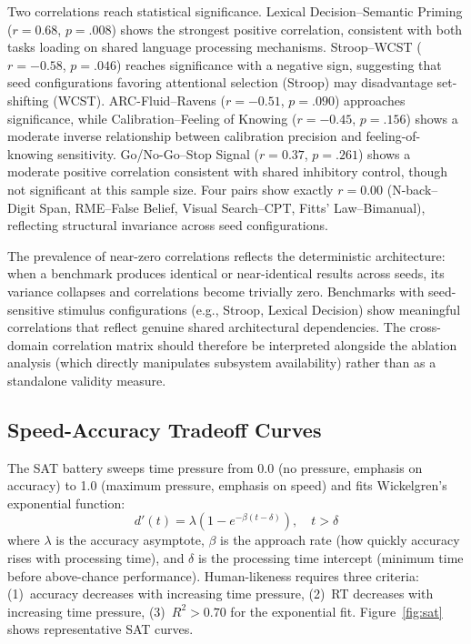 \documentclass[11pt,letterpaper]{article}
\begin{document}
Two correlations reach statistical significance. Lexical Decision--Semantic Priming ($r = 0.68$, $p = .008$) shows the strongest positive correlation, consistent with both tasks loading on shared language processing mechanisms. Stroop--WCST ($r = -0.58$, $p = .046$) reaches significance with a negative sign, suggesting that seed configurations favoring attentional selection (Stroop) may disadvantage set-shifting (WCST). ARC-Fluid--Ravens ($r = -0.51$, $p = .090$) approaches significance, while Calibration--Feeling of Knowing ($r = -0.45$, $p = .156$) shows a moderate inverse relationship between calibration precision and feeling-of-knowing sensitivity. Go/No-Go--Stop Signal ($r = 0.37$, $p = .261$) shows a moderate positive correlation consistent with shared inhibitory control, though not significant at this sample size. Four pairs show exactly $r = 0.00$ (N-back--Digit Span, RME--False Belief, Visual Search--CPT, Fitts' Law--Bimanual), reflecting structural invariance across seed configurations.

The prevalence of near-zero correlations reflects the deterministic architecture: when a benchmark produces identical or near-identical results across seeds, its variance collapses and correlations become trivially zero. Benchmarks with seed-sensitive stimulus configurations (e.g., Stroop, Lexical Decision) show meaningful correlations that reflect genuine shared architectural dependencies. The cross-domain correlation matrix should therefore be interpreted alongside the ablation analysis (which directly manipulates subsystem availability) rather than as a standalone validity measure.

\subsection{Speed-Accuracy Tradeoff Curves}

The SAT battery sweeps time pressure from 0.0 (no pressure, emphasis on accuracy) to 1.0 (maximum pressure, emphasis on speed) and fits Wickelgren's~\citep{wickelgren1977speed} exponential function:
\begin{equation}
d'(t) = \lambda \left(1 - e^{-\beta(t - \delta)}\right), \quad t > \delta
\label{eq:sat}
\end{equation}
where $\lambda$ is the accuracy asymptote, $\beta$ is the approach rate (how quickly accuracy rises with processing time), and $\delta$ is the processing time intercept (minimum time before above-chance performance). Human-likeness requires three criteria: (1)~accuracy decreases with increasing time pressure, (2)~RT decreases with increasing time pressure, (3)~$R^2 > 0.70$ for the exponential fit. Figure~\ref{fig:sat} shows representative SAT curves.
\end{document}
